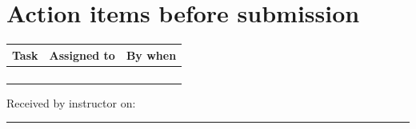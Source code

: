 \section*{Action items before submission}
\begin{tabularx}{\linewidth}{|X|L{4cm}|L{2.8cm}|}
  \hline
  Task & Assigned to & By when \\\hline
   & & \\\hline
   & & \\\hline
   & & \\\hline
   & & \\\hline
\end{tabularx}

\vspace{1em}
{\color{muted}\small Received by instructor on: \rule{6cm}{0.4pt}}


